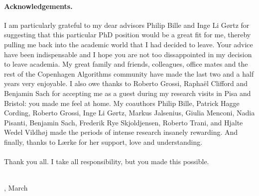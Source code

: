 \paragraph{Acknowledgements.}
I am particularly grateful to my dear advisors Philip Bille and Inge Li Gørtz for suggesting that this particular PhD position would be a great fit for me, thereby pulling me back into the academic world that I had decided to leave. Your advice have been indispensable and I hope you are not too dissappointed in my decision to leave academia. 
My great family and friends, colleagues, office mates and the rest of the Copenhagen Algorithms community have made the last two and a half years very enjoyable. 
I also owe thanks to Roberto Grossi, Raphaël Clifford and Benjamin Sach for accepting me as a guest during my research visits in Pisa and Bristol: you made me feel at home.
My coauthors Philip Bille, Patrick Hagge Cording, Roberto Grossi, Inge Li Gørtz, Markus Jalsenius, Giulia Menconi, Nadia Pisanti, Benjamin Sach, Frederik Rye Skjoldjensen, Roberto Trani, and Hjalte Wedel Vildhøj made the periods of intense research insanely rewarding. And finally, thanks to Lærke for her support, love and understanding.\\
~\\
\noindent Thank you all. I take all responsibility, but you made this possible.


\vfill
\begin{flushright}
    \thesisauthor{}\\
    \thesislocation{}, March \the\year
\end{flushright}


 

